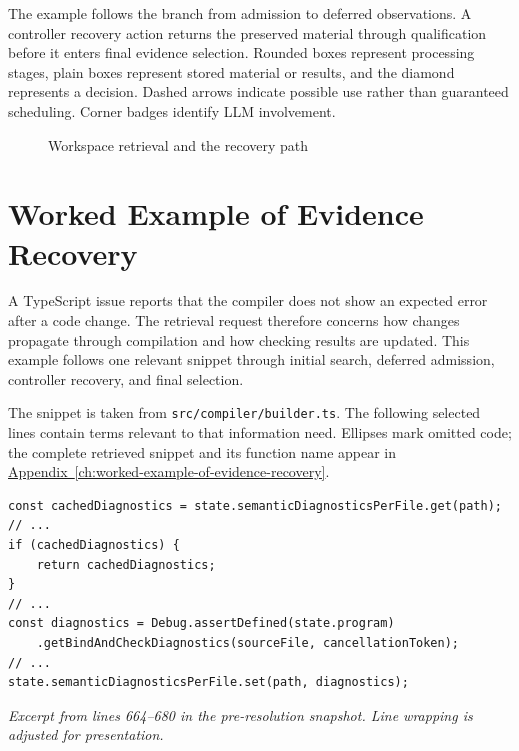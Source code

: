 The example follows the branch from admission to deferred observations. A controller recovery action returns the preserved material through qualification before it enters final evidence selection. Rounded boxes represent processing stages, plain boxes represent stored material or results, and the diamond represents a decision. Dashed arrows indicate possible use rather than guaranteed scheduling. Corner badges identify LLM involvement.

\begin{figure}[p]
\centering
\begingroup

\resizebox{\linewidth}{!}{}
\endgroup
\caption{Workspace retrieval and the recovery path}\label{fig:workspace-retrieval}
\end{figure}
\FloatBarrier

\section{Worked Example of Evidence Recovery}\label{sec:worked-example-of-evidence-recovery}

A TypeScript issue reports that the compiler does not show an expected error after a code change. The retrieval request therefore concerns how changes propagate through compilation and how checking results are updated. This example follows one relevant snippet through initial search, deferred admission, controller recovery, and final selection.

The snippet is taken from \texttt{src/compiler/builder.ts}. The following selected lines contain terms relevant to that information need. Ellipses mark omitted code; the complete retrieved snippet and its function name appear in \hyperref[ch:worked-example-of-evidence-recovery]{Appendix~\ref*{ch:worked-example-of-evidence-recovery}}.

\begin{verbatim}
const cachedDiagnostics = state.semanticDiagnosticsPerFile.get(path);
// ...
if (cachedDiagnostics) {
    return cachedDiagnostics;
}
// ...
const diagnostics = Debug.assertDefined(state.program)
    .getBindAndCheckDiagnostics(sourceFile, cancellationToken);
// ...
state.semanticDiagnosticsPerFile.set(path, diagnostics);
\end{verbatim}

\emph{Excerpt from lines 664--680 in the pre-resolution snapshot. Line wrapping is adjusted for presentation.}

